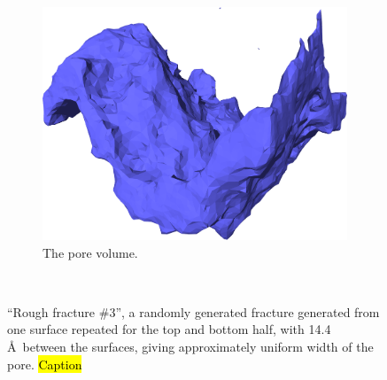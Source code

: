 \begin{figure}[!p]
\begin{subfigure}[t]{\myfigwidth}
        \includegraphics[width=\textwidth]{images/systems/trimmed-rough_fracture04_11}%
        \caption{The pore volume.}%
    \end{subfigure}%
    \vspace{10pt}\\%
    \caption{%
        ``Rough fracture \#3'', a randomly generated fracture generated from one surface repeated for the top and bottom half, with 14.4 \AA\ between the surfaces, giving approximately uniform width of the pore. \hl{Caption} %
        \label{fig:renderings_rough_fracture04_same_distance}%
    }%
\end{figure}%

